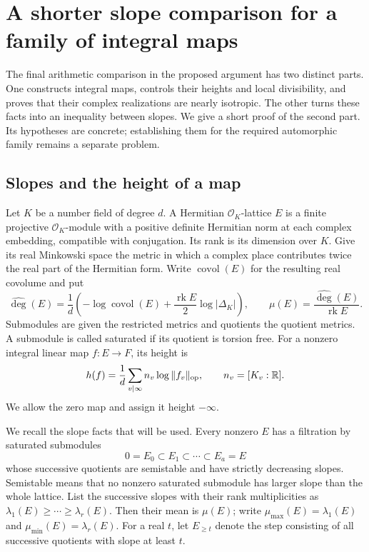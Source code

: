 \section{A shorter slope comparison for a family of integral maps}
\label{cs-section}

The final arithmetic comparison in the proposed argument\cite{alpo-central-comparison} has two distinct
parts. One constructs integral maps, controls their heights and local
divisibility, and proves that their complex realizations are nearly isotropic.
The other turns these facts into an inequality between slopes. We give a
short proof of the second part. Its hypotheses are concrete; establishing
them for the required automorphic family remains a separate problem.

\subsection{Slopes and the height of a map}

Let $K$ be a number field of degree $d$. A Hermitian $\mathcal O_K$-lattice
$E$ is a finite projective $\mathcal O_K$-module with a positive definite
Hermitian norm at each complex embedding, compatible with conjugation.
Its rank is its dimension over $K$. Give its real Minkowski space the
metric in which a complex place contributes twice the real part of the
Hermitian form. Write $\operatorname{covol}(E)$ for the resulting real
covolume and put
\[
 \widehat{\deg}(E)
 =\frac1d\left(-\log\operatorname{covol}(E)
                  +\frac{\operatorname{rk}E}{2}\log|\Delta_K|\right),
 \qquad \mu(E)=\frac{\widehat{\deg}(E)}{\operatorname{rk}E}.
\]
Submodules are given the restricted metrics and quotients the quotient
metrics. A submodule is called saturated if its quotient is torsion free.
For a nonzero integral linear map $f:E\to F$, its height is
\[
 h(f)=\frac1d\sum_{v\mid\infty}n_v\log\|f_v\|_{\rm op},
 \qquad n_v=[K_v:\mathbb R].
\]
We allow the zero map and assign it height $-\infty$.

We recall the slope facts that will be used. Every nonzero $E$ has a
filtration by saturated submodules
\[
 0=E_0\subset E_1\subset\cdots\subset E_a=E
\]
whose successive quotients are semistable and have strictly decreasing
slopes. Semistable means that no nonzero saturated submodule has larger
slope than the whole lattice. List the successive slopes with their
rank multiplicities as
$\lambda_1(E)\ge\cdots\ge\lambda_r(E)$.
Then their mean is $\mu(E)$; write
$\mu_{\max}(E)=\lambda_1(E)$ and
$\mu_{\min}(E)=\lambda_r(E)$. For a real $t$, let $E_{\ge t}$ denote the
step consisting of all successive quotients with slope at least $t$.

